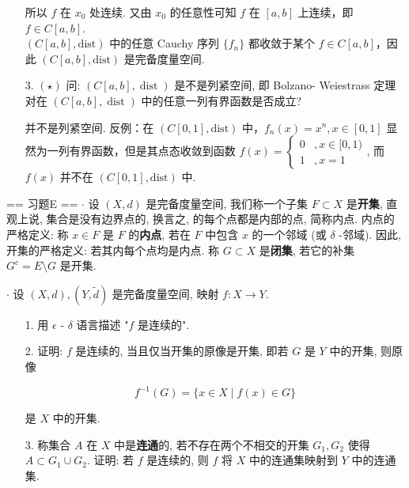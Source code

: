 \begin{enumerate}
\begin{solution}
\[        \]
        所以 $f$ 在 $x_{0}$ 处连续. 又由 $x_{0}$ 的任意性可知 $f$ 在 $[a,b]$ 上连续，即 $f\in C[a,b]$.\\
        $(C[a,b],\mathrm{dist})$ 中的任意 Cauchy 序列 $\{f_{n}\}$ 都收敛于某个 $f\in C[a,b]$，因此 $(C[a,b],\mathrm{dist})$ 是完备度量空间.
    \end{solution}
    \item[3.]$(\star)$ 问: $\displaystyle(C[a, b], \operatorname {dist})$ 是不是列紧空间, 即 Bolzano- Weiestrass 定理对在 $\displaystyle(C[a, b], \operatorname {dist})$ 中的任意一列有界函数是否成立?
        \begin{solution}
            并不是列紧空间. 反例：在 $(C[0,1],\mathrm{dist})$ 中，$f_n(x)=x^n,x\in[0,1]$ 显然为一列有界函数，但是其点态收敛到函数 
            $f(x)=
            \begin{cases}
                0 &, x\in[0,1)\\
                1 &, x=1
            \end{cases}$, 而 $f(x)$ 并不在 $(C[0,1],\mathrm{dist})$ 中.
        \end{solution}
\end{enumerate}
    

== 习题E ==
$\cdot$ 设 $(X, d)$ 是完备度量空间, 我们称一个子集 $F \subset X$ 是\textbf{开集}, 直观上说, 集合是没有边界点的, 换言之, 的每个点都是内部的点, 简称内点. 
内点的严格定义: 称 $x \in F$ 是 $F$ 的\textbf{内点}, 若在 $F$ 中包含 $x$ 的一个邻域 (或 $\delta$ -邻域). 
因此, 开集的严格定义: 若其内每个点均是内点. 称 $G \subset X$ 是\textbf{闭集}, 若它的补集 $G^c = E \setminus G$ 是开集.

$\cdot$ 设 $(X, d), (Y, \tilde{d})$ 是完备度量空间, 映射 $f: X \to Y$.

\begin{enumerate}
    \item[1.]用 $\epsilon$ - $\delta$ 语言描述 "$f$ 是连续的".
    \item[2.] 证明: $f$ 是连续的, 当且仅当开集的原像是开集, 即若 $G$ 是 $Y$ 中的开集, 则原像

    \[\displaystyle f^{-1}(G) = \{x \in X\mid f(x) \in G\}\]

    是 $X$ 中的开集.
    \item[3.]称集合 $A$ 在 $X$ 中是\textbf{连通}的, 若不存在两个不相交的开集 $G_1, G_2$ 使得 $A \subset G_1 \cup G_2$. 
    证明: 若 $f$ 是连续的, 则 $f$ 将 $X$ 中的连通集映射到 $Y$ 中的连通集.
\end{enumerate}